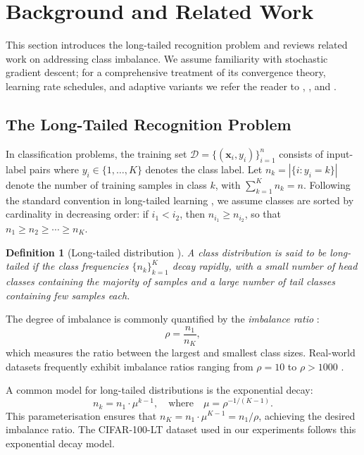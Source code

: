 \documentclass[12pt,a4paper]{article}
\newtheorem{definition}{Definition}
\newcommand{\bx}{\mathbf{x}}
\begin{document}
\section{Background and Related Work}
\label{sec:background}
This section introduces the long-tailed recognition problem and reviews related work on addressing class imbalance. We assume familiarity with stochastic gradient descent; for a comprehensive treatment of its convergence theory, learning rate schedules, and adaptive variants we refer the reader to \citet{robbins1951stochastic}, \citet{bottou2018optimization}, and \citet{bishop2006pattern}.

\subsection{The Long-Tailed Recognition Problem}
\label{subsec:longtail_problem}
In classification problems, the training set $\mathcal{D} = \{(\bx_i, y_i)\}_{i=1}^{n}$ consists of input-label pairs where $y_i \in \{1, \ldots, K\}$ denotes the class label. Let $n_k = |\{i : y_i = k\}|$ denote the number of training samples in class $k$, with $\sum_{k=1}^{K} n_k = n$. Following the standard convention in long-tailed learning \citep{zhang2023deep}, we assume classes are sorted by cardinality in decreasing order: if $i_1 < i_2$, then $n_{i_1} \geq n_{i_2}$, so that $n_1 \geq n_2 \geq \cdots \geq n_K$.

\begin{definition}[Long-tailed distribution \citep{zhang2023deep}]
A class distribution is said to be long-tailed if the class frequencies $\{n_k\}_{k=1}^{K}$ decay rapidly, with a small number of head classes containing the majority of samples and a large number of tail classes containing few samples each.
\end{definition}

The degree of imbalance is commonly quantified by the \textit{imbalance ratio} \citep{zhang2023deep}:
\begin{equation}
    \rho = \frac{n_1}{n_K},
    \label{eq:imbalance_ratio}
\end{equation}
which measures the ratio between the largest and smallest class sizes. Real-world datasets frequently exhibit imbalance ratios ranging from $\rho = 10$ to $\rho > 1000$ \citep{liu2019large}.

A common model for long-tailed distributions is the exponential decay:
\begin{equation}
    n_k = n_1 \cdot \mu^{k-1}, \quad \text{where} \quad \mu = \rho^{-1/(K-1)}.
    \label{eq:exponential_decay}
\end{equation}
This parameterisation ensures that $n_K = n_1 \cdot \mu^{K-1} = n_1 / \rho$, achieving the desired imbalance ratio. The CIFAR-100-LT dataset used in our experiments follows this exponential decay model.
\end{document}
